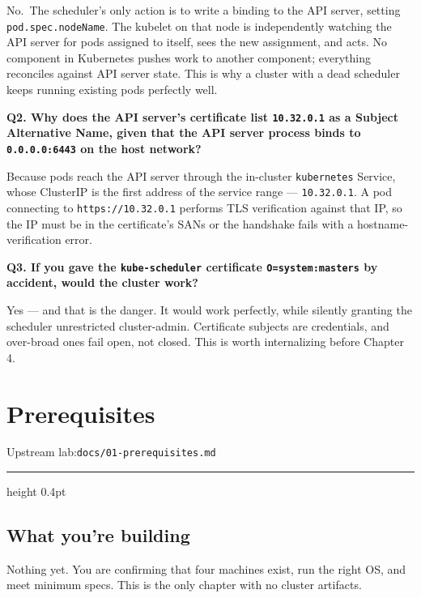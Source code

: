 \documentclass[11pt,oneside]{report}
\newcommand{\upstreamlab}[1]{%
  {\sffamily\footnotesize\color{steel}Upstream lab:\quad\texttt{#1}}\par\vspace{2pt}%
  {\color{rule}\hrule height 0.4pt}\vspace{8pt}}
\begin{document}
No.~The scheduler's
only action is to
write a binding to
the API server,
setting
\texttt{pod.}\allowbreak{}\texttt{spec.}\allowbreak{}\texttt{nodeName}.
The kubelet on that
node is
independently
watching the API
server for pods
assigned to itself,
sees the new
assignment, and
acts. No component
in Kubernetes pushes
work to another
component;
everything
reconciles against
API server state.
This is why a
cluster with a dead
scheduler keeps
running existing
pods perfectly well.

\textbf{Q2. Why does
the API server's
certificate list
\texttt{10.32.0.1}
as a Subject
Alternative Name,
given that the API
server process binds
to
\texttt{0.0.0.0:6443}
on the host
network?}

Because pods reach
the API server
through the
in-cluster
\texttt{kubernetes}
Service, whose
ClusterIP is the
first address of the
service range ---
\texttt{10.32.0.1}.
A pod connecting to
\texttt{https:}\allowbreak{}\texttt{/}\allowbreak{}\texttt{/}\allowbreak{}\texttt{10.}\allowbreak{}\texttt{32.}\allowbreak{}\texttt{0.}\allowbreak{}\texttt{1}
performs TLS
verification against
that IP, so the IP
must be in the
certificate's SANs
or the handshake
fails with a
hostname-verification
error.

\textbf{Q3. If you
gave the
\texttt{kube-scheduler}
certificate
\texttt{O=system:}\allowbreak{}\texttt{masters}
by accident, would
the cluster work?}

Yes --- and that is
the danger. It would
work perfectly,
while silently
granting the
scheduler
unrestricted
cluster-admin.
Certificate subjects
are credentials, and
over-broad ones fail
open, not closed.
This is worth
internalizing before
Chapter 4.

\hypertarget{chap-1}{%
\chapter{Prerequisites}\label{chap-1}}

\upstreamlab{docs/01-prerequisites.md}

\hypertarget{what-youre-building-1}{%
\section{What you're
building}\label{what-youre-building-1}}

Nothing yet. You are
confirming that four
machines exist, run
the right OS, and
meet minimum specs.
This is the only
chapter with no
cluster artifacts.
\end{document}
